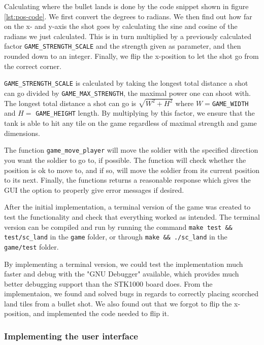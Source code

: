 

Calculating where the bullet lands is done by the code snippet shown in
figure \ref{lst:pos-code}. We first convert the degrees to radians. We
then find out how far on the x- and y-axis the shot goes by calculating
the sine and cosine of the radians we just calculated. This is in turn
multiplied by a previously calculated factor
\texttt{GAME\_STRENGTH\_SCALE} and the strength given as parameter, and
then rounded down to an integer. Finally, we flip the x-position to
let the shot go from the correct corner.

\texttt{GAME\_STRENGTH\_SCALE} is calculated by taking the longest total
distance a shot can go divided by \texttt{GAME\_MAX\_STRENGTH}, the
maximal power one can shoot with.  The longest total distance a shot can
go is $\sqrt{W^2 + H^2}$ where $W = $\texttt{GAME\_WIDTH} and $H =$
\texttt{GAME\_HEIGHT} length.  By multiplying by this factor, we ensure
that the tank is able to hit any tile on the game regardless of maximal
strength and game dimensions. 



The function \texttt{game\_move\_player} will move the soldier with the
specified direction you want the soldier to go to, if possible. The
function will check whether the position is ok to move to, and if so,
will move the soldier from its current position to its next. Finally,
the functions returns a reasonable response which gives the GUI
the option to properly give error messages if desired.

After the initial implementation, a terminal version of the game was
created to test the functionality and check that everything worked as intended.
The terminal version can be compiled and run by running the command 
\verb|make test && test/sc_land| in the \texttt{game} folder, or
through \verb|make && ./sc_land| in the \texttt{game/test} folder.



By implementing a terminal version, we could test the implementation
much faster and debug with the "GNU Debugger" available, which provides 
much better debugging support than the STK1000 board does. From the
implementaion, we found and solved bugs in regards to correctly placing
scorched land tiles from a bullet shot. We also found out that we forgot to
flip the x-position, and implemented the code needed to flip it.

\subsubsection{Implementing the user interface}


